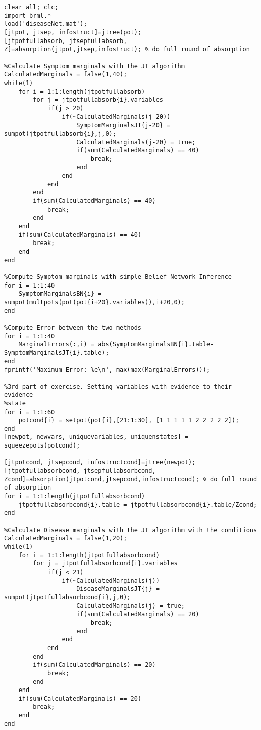 \documentclass[11pt,a4paper,oneside]{report}
\begin{document}
\begin{lstlisting}
clear all; clc;
import brml.*
load('diseaseNet.mat');
[jtpot, jtsep, infostruct]=jtree(pot);
[jtpotfullabsorb, jtsepfullabsorb, Z]=absorption(jtpot,jtsep,infostruct); % do full round of absorption

%Calculate Symptom marginals with the JT algorithm
CalculatedMarginals = false(1,40);
while(1)
    for i = 1:1:length(jtpotfullabsorb)
        for j = jtpotfullabsorb{i}.variables
            if(j > 20)
                if(~CalculatedMarginals(j-20))
                    SymptomMarginalsJT{j-20} = sumpot(jtpotfullabsorb{i},j,0);
                    CalculatedMarginals(j-20) = true;
                    if(sum(CalculatedMarginals) == 40)
                        break;
                    end
                end
            end
        end
        if(sum(CalculatedMarginals) == 40)
            break;
        end
    end
    if(sum(CalculatedMarginals) == 40)
        break;
    end
end

%Compute Symptom marginals with simple Belief Network Inference
for i = 1:1:40
    SymptomMarginalsBN{i} = sumpot(multpots(pot(pot{i+20}.variables)),i+20,0);
end

%Compute Error between the two methods
for i = 1:1:40
    MarginalErrors(:,i) = abs(SymptomMarginalsBN{i}.table-SymptomMarginalsJT{i}.table);
end
fprintf('Maximum Error: %e\n', max(max(MarginalErrors)));

%3rd part of exercise. Setting variables with evidence to their evidence
%state
for i = 1:1:60
    potcond{i} = setpot(pot{i},[21:1:30], [1 1 1 1 1 2 2 2 2 2]);
end
[newpot, newvars, uniquevariables, uniquenstates] = squeezepots(potcond);

[jtpotcond, jtsepcond, infostructcond]=jtree(newpot);
[jtpotfullabsorbcond, jtsepfullabsorbcond, Zcond]=absorption(jtpotcond,jtsepcond,infostructcond); % do full round of absorption
for i = 1:1:length(jtpotfullabsorbcond)
    jtpotfullabsorbcond{i}.table = jtpotfullabsorbcond{i}.table/Zcond;
end

%Calculate Disease marginals with the JT algorithm with the conditions
CalculatedMarginals = false(1,20);
while(1)
    for i = 1:1:length(jtpotfullabsorbcond)
        for j = jtpotfullabsorbcond{i}.variables
            if(j < 21)
                if(~CalculatedMarginals(j))
                    DiseaseMarginalsJT{j} = sumpot(jtpotfullabsorbcond{i},j,0);
                    CalculatedMarginals(j) = true;
                    if(sum(CalculatedMarginals) == 20)
                        break;
                    end
                end
            end
        end
        if(sum(CalculatedMarginals) == 20)
            break;
        end
    end
    if(sum(CalculatedMarginals) == 20)
        break;
    end
end


\end{lstlisting}
\end{document}

